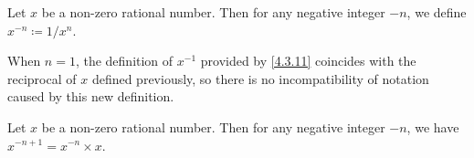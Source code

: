 \begin{definition}\label{4.3.11}
  Let \(x\) be a non-zero rational number.
  Then for any negative integer \(-n\), we define \(x^{-n} \coloneqq 1 / x^n\).
\end{definition}

\begin{note}
  When \(n = 1\), the definition of \(x^{-1}\) provided by \cref{4.3.11} coincides with the reciprocal of \(x\) defined previously, so there is no incompatibility of notation caused by this new definition.
\end{note}

\begin{additional corollary}\label{ac 4.3.2}
Let \(x\) be a non-zero rational number.
Then for any negative integer \(-n\), we have \(x^{-n + 1} = x^{-n} \times x\).
\end{additional corollary}

